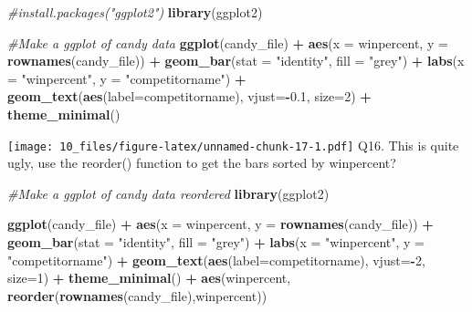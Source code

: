\documentclass[
]{article}
\newenvironment{Shaded}{\begin{snugshade}}{\end{snugshade}}
\newcommand{\AttributeTok}[1]{\textcolor[rgb]{0.13,0.29,0.53}{#1}}
\newcommand{\CommentTok}[1]{\textcolor[rgb]{0.56,0.35,0.01}{\textit{#1}}}
\newcommand{\DecValTok}[1]{\textcolor[rgb]{0.00,0.00,0.81}{#1}}
\newcommand{\FloatTok}[1]{\textcolor[rgb]{0.00,0.00,0.81}{#1}}
\newcommand{\FunctionTok}[1]{\textcolor[rgb]{0.13,0.29,0.53}{\textbf{#1}}}
\newcommand{\NormalTok}[1]{#1}
\newcommand{\SpecialCharTok}[1]{\textcolor[rgb]{0.81,0.36,0.00}{\textbf{#1}}}
\newcommand{\StringTok}[1]{\textcolor[rgb]{0.31,0.60,0.02}{#1}}
\begin{document}
\begin{Shaded}
\begin{Highlighting}[]
\CommentTok{\#install.packages("ggplot2")}
\FunctionTok{library}\NormalTok{(ggplot2)}

\CommentTok{\#Make a ggplot of candy data}
\FunctionTok{ggplot}\NormalTok{(candy\_file) }\SpecialCharTok{+} 
  \FunctionTok{aes}\NormalTok{(}\AttributeTok{x =}\NormalTok{ winpercent, }\AttributeTok{y =} \FunctionTok{rownames}\NormalTok{(candy\_file)) }\SpecialCharTok{+}
  \FunctionTok{geom\_bar}\NormalTok{(}\AttributeTok{stat =} \StringTok{"identity"}\NormalTok{, }\AttributeTok{fill =} \StringTok{"grey"}\NormalTok{) }\SpecialCharTok{+}
  \FunctionTok{labs}\NormalTok{(}\AttributeTok{x =} \StringTok{"winpercent"}\NormalTok{, }\AttributeTok{y =} \StringTok{"competitorname"}\NormalTok{) }\SpecialCharTok{+}
  \FunctionTok{geom\_text}\NormalTok{(}\FunctionTok{aes}\NormalTok{(}\AttributeTok{label=}\NormalTok{competitorname), }\AttributeTok{vjust=}\SpecialCharTok{{-}}\FloatTok{0.1}\NormalTok{, }\AttributeTok{size=}\DecValTok{2}\NormalTok{) }\SpecialCharTok{+}
  \FunctionTok{theme\_minimal}\NormalTok{()}
\end{Highlighting}
\end{Shaded}

\texttt{[image: 10\_files/figure-latex/unnamed-chunk-17-1.pdf]} Q16. This
is quite ugly, use the reorder() function to get the bars sorted by
winpercent?

\begin{Shaded}
\begin{Highlighting}[]
\CommentTok{\#Make a ggplot of candy data reordered}
\FunctionTok{library}\NormalTok{(ggplot2)}

\FunctionTok{ggplot}\NormalTok{(candy\_file) }\SpecialCharTok{+} 
  \FunctionTok{aes}\NormalTok{(}\AttributeTok{x =}\NormalTok{ winpercent, }\AttributeTok{y =} \FunctionTok{rownames}\NormalTok{(candy\_file)) }\SpecialCharTok{+}
  \FunctionTok{geom\_bar}\NormalTok{(}\AttributeTok{stat =} \StringTok{"identity"}\NormalTok{, }\AttributeTok{fill =} \StringTok{"grey"}\NormalTok{) }\SpecialCharTok{+}
  \FunctionTok{labs}\NormalTok{(}\AttributeTok{x =} \StringTok{"winpercent"}\NormalTok{, }\AttributeTok{y =} \StringTok{"competitorname"}\NormalTok{) }\SpecialCharTok{+}
  \FunctionTok{geom\_text}\NormalTok{(}\FunctionTok{aes}\NormalTok{(}\AttributeTok{label=}\NormalTok{competitorname), }\AttributeTok{vjust=}\SpecialCharTok{{-}}\DecValTok{2}\NormalTok{, }\AttributeTok{size=}\DecValTok{1}\NormalTok{) }\SpecialCharTok{+}
  \FunctionTok{theme\_minimal}\NormalTok{() }\SpecialCharTok{+} \FunctionTok{aes}\NormalTok{(winpercent, }\FunctionTok{reorder}\NormalTok{(}\FunctionTok{rownames}\NormalTok{(candy\_file),winpercent))}
\end{Highlighting}
\end{Shaded}
\end{document}
